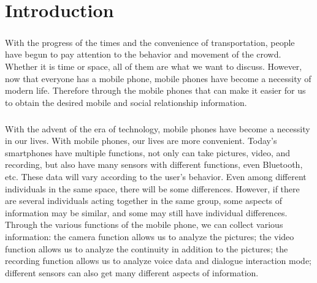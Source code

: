 \documentclass[a4paper,12pt]{report}
\begin{document}
\setcounter{page}{4}
\tableofcontents \newpage
{}
\listoffigures \newpage
{}
\listoftables \newpage
{}

\setcounter{page}{1}
\chapter{Introduction}

\paragraph{}
With the progress of the times and the convenience of transportation, people have begun to pay attention to the behavior and movement of the crowd. Whether it is time or space, all of them are what we want to discuss. However, now that everyone has a mobile phone, mobile phones have become a necessity of modern life. Therefore through the mobile phones that can make it easier for us to obtain the desired mobile and social relationship information.
\paragraph{}
With the advent of the era of technology, mobile phones have become a necessity in our lives. With mobile phones, our lives are more convenient. Today's smartphones have multiple functions, not only can take pictures, video, and recording, but also have many sensors with different functions, even Bluetooth, etc. These data will vary according to the user's behavior. Even among different individuals in the same space, there will be some differences. However, if there are several individuals acting together in the same group, some aspects of information may be similar, and some may still have individual differences. Through the various functions of the mobile phone, we can collect various information: the camera function allows us to analyze the pictures; the video function allows us to analyze the continuity in addition to the pictures; the recording function allows us to analyze voice data and dialogue interaction mode; different sensors can also get many different aspects of information.

\end{document}
